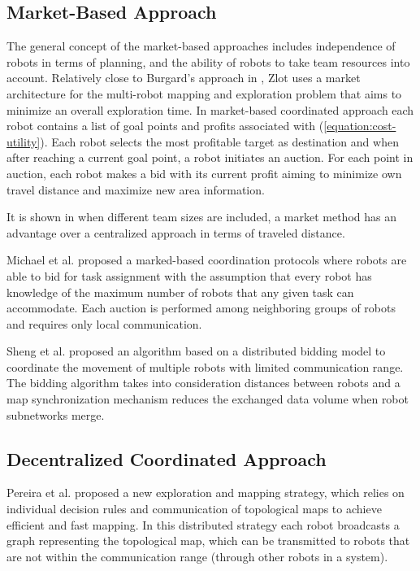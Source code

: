 \subsection{Market-Based Approach}

The general concept of the market-based approaches includes independence of robots in terms of planning, and the ability of robots to take team resources into account.
Relatively close to Burgard's approach in \cite{Burgard2000}, Zlot \cite{Zlot2002} uses a market architecture for the multi-robot mapping and exploration problem that aims to minimize an overall exploration time. In market-based coordinated approach each robot contains a list of goal points and profits associated with (\ref{equation:cost-utility}). Each robot selects the most profitable target as destination and when after reaching a current goal point, a robot initiates an auction. For each point in auction, each robot makes a bid with its current profit aiming to minimize own travel distance and maximize new area information.

It is shown in \cite{Dias2003} when different team sizes are included, a market method has an advantage over a centralized approach in terms of traveled distance. 

Michael et al. \cite{Michael2008} proposed a marked-based coordination protocols where robots are able to bid for task assignment with the assumption that every robot has knowledge of the maximum number of robots that any given task can accommodate. Each auction is performed among neighboring groups of robots and requires only local communication.

Sheng et al. \cite{Sheng2006} proposed an algorithm based on a distributed bidding model to coordinate the movement of multiple robots with limited communication range. The bidding algorithm takes into consideration distances between robots and a map synchronization mechanism reduces the exchanged data volume when robot subnetworks merge.

\subsection{Decentralized Coordinated Approach}

Pereira et al. \cite{Pereira2015} proposed a new exploration and mapping strategy, which relies on individual decision rules and communication of topological maps to achieve efficient and fast mapping. In this distributed strategy each robot broadcasts a graph representing the topological map, which can be transmitted to robots that are not within the communication range (through other robots in a system). 

